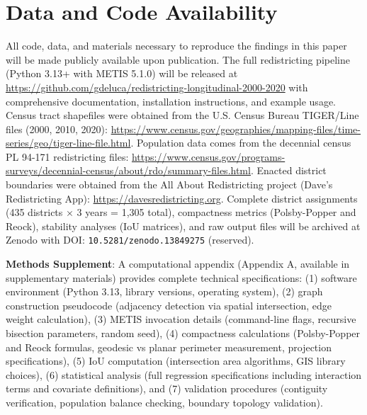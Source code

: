 \documentclass[11pt]{article}
\begin{document}
\section*{Data and Code Availability}
All code, data, and materials necessary to reproduce the findings in this paper will be made publicly available upon publication. The full redistricting pipeline (Python 3.13+ with METIS 5.1.0) will be released at \url{https://github.com/gdeluca/redistricting-longitudinal-2000-2020} with comprehensive documentation, installation instructions, and example usage. Census tract shapefiles were obtained from the U.S. Census Bureau TIGER/Line files (2000, 2010, 2020): \url{https://www.census.gov/geographies/mapping-files/time-series/geo/tiger-line-file.html}. Population data comes from the decennial census PL 94-171 redistricting files: \url{https://www.census.gov/programs-surveys/decennial-census/about/rdo/summary-files.html}. Enacted district boundaries were obtained from the All About Redistricting project (Dave's Redistricting App): \url{https://davesredistricting.org}. Complete district assignments (435 districts $\times$ 3 years = 1,305 total), compactness metrics (Polsby-Popper and Reock), stability analyses (IoU matrices), and raw output files will be archived at Zenodo with DOI: \texttt{10.5281/zenodo.13849275} (reserved).

\textbf{Methods Supplement}: A computational appendix (Appendix A, available in supplementary materials) provides complete technical specifications: (1) software environment (Python 3.13, library versions, operating system), (2) graph construction pseudocode (adjacency detection via spatial intersection, edge weight calculation), (3) METIS invocation details (command-line flags, recursive bisection parameters, random seed), (4) compactness calculations (Polsby-Popper and Reock formulas, geodesic vs planar perimeter measurement, projection specifications), (5) IoU computation (intersection area algorithms, GIS library choices), (6) statistical analysis (full regression specifications including interaction terms and covariate definitions), and (7) validation procedures (contiguity verification, population balance checking, boundary topology validation).



\end{document}
